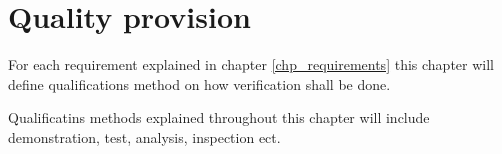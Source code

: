 \label{chp_qualityProvision}
\chapter{Quality provision}
For each requirement explained in chapter \ref{chp_requirements} this chapter will define qualifications method on how verification shall be done.

Qualificatins methods explained throughout this chapter will include demonstration, test, analysis, inspection ect.